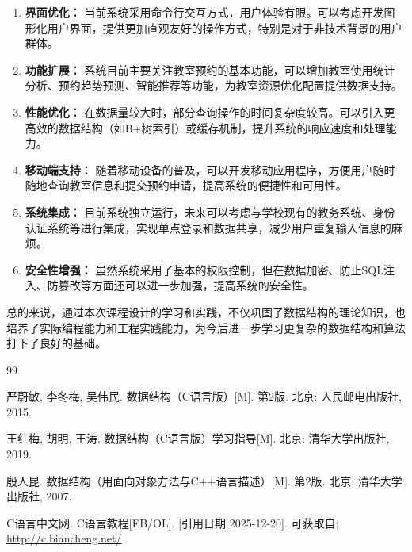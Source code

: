 \documentclass[a4paper,12pt,twoside]{ctexrep}
\begin{document}
\begin{enumerate}
  \item \textbf{界面优化：} 当前系统采用命令行交互方式，用户体验有限。可以考虑开发图形化用户界面，提供更加直观友好的操作方式，特别是对于非技术背景的用户群体。
  \item \textbf{功能扩展：} 系统目前主要关注教室预约的基本功能，可以增加教室使用统计分析、预约趋势预测、智能推荐等功能，为教室资源优化配置提供数据支持。
  \item \textbf{性能优化：} 在数据量较大时，部分查询操作的时间复杂度较高。可以引入更高效的数据结构（如B+树索引）或缓存机制，提升系统的响应速度和处理能力。
  \item \textbf{移动端支持：} 随着移动设备的普及，可以开发移动应用程序，方便用户随时随地查询教室信息和提交预约申请，提高系统的便捷性和可用性。
  \item \textbf{系统集成：} 目前系统独立运行，未来可以考虑与学校现有的教务系统、身份认证系统等进行集成，实现单点登录和数据共享，减少用户重复输入信息的麻烦。
  \item \textbf{安全性增强：} 虽然系统采用了基本的权限控制，但在数据加密、防止SQL注入、防篡改等方面还可以进一步加强，提高系统的安全性。
\end{enumerate}

总的来说，通过本次课程设计的学习和实践，不仅巩固了数据结构的理论知识，也培养了实际编程能力和工程实践能力，为今后进一步学习更复杂的数据结构和算法打下了良好的基础。
\clearpage
\cleardoublepage

{}

\begin{thebibliography}{99}

 严蔚敏, 李冬梅, 吴伟民. 数据结构（C语言版）[M]. 第2版. 北京: 人民邮电出版社, 2015.

 王红梅, 胡明, 王涛. 数据结构（C语言版）学习指导[M]. 北京: 清华大学出版社, 2019.

 殷人昆. 数据结构（用面向对象方法与C++语言描述）[M]. 第2版. 北京: 清华大学出版社, 2007.

 C语言中文网. C语言教程[EB/OL]. [引用日期 2025-12-20]. 可获取自: \url{http://c.biancheng.net/}

\end{thebibliography}

\appendix
\end{document}
